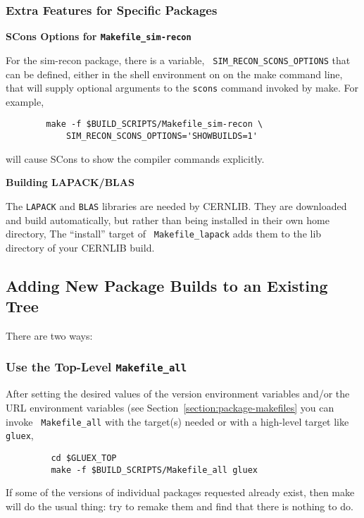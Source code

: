 \documentclass[12pt]{article}
\begin{document}
\subsubsection{Extra Features for Specific Packages}\label{section:makefile-extras}

\begin{description}

\item{\bf SCons Options for {\tt Makefile\_sim-recon}}

For the sim-recon package, there is a variable, {\tt
  SIM\_RECON\_SCONS\_OPTIONS} that can be defined, either in the shell
environment on on the make command line, that will supply optional
arguments to the {\tt scons} command invoked by make. For example,
\begin{verbatim}
        make -f $BUILD_SCRIPTS/Makefile_sim-recon \
            SIM_RECON_SCONS_OPTIONS='SHOWBUILDS=1'
\end{verbatim}
will cause SCons to show the compiler commands explicitly.

\item{\bf Building LAPACK/BLAS}

The {\tt LAPACK} and {\tt BLAS} libraries are needed by CERNLIB. They
are downloaded and build automatically, but rather than being
installed in their own home directory, The ``install'' target of {\tt
  Makefile\_lapack} adds them to the lib directory of your CERNLIB
build.

\end{description}

\subsection{Adding New Package Builds to an Existing Tree}\label{section:adding-packages}

There are two ways:

\subsubsection{Use the Top-Level {\tt Makefile\_all}}

After setting the desired values of the version environment variables
and/or the URL environment variables (see
Section~\ref{section:package-makefiles} you can invoke {\tt
  Makefile\_all} with the target(s) needed or with a high-level target
like {\tt gluex},
\begin{verbatim}
         cd $GLUEX_TOP
         make -f $BUILD_SCRIPTS/Makefile_all gluex
\end{verbatim}
If some of the versions of individual packages requested already
exist, then make will do the usual thing: try to remake them and find
that there is nothing to do.
\end{document}
